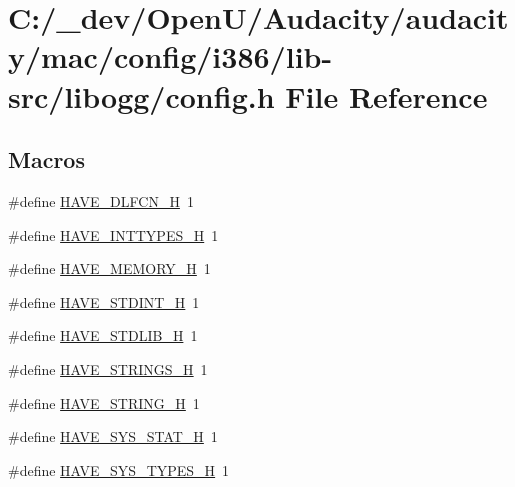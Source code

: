 \hypertarget{mac_2config_2i386_2lib-src_2libogg_2config_8h}{}\section{C\+:/\+\_\+dev/\+Open\+U/\+Audacity/audacity/mac/config/i386/lib-\/src/libogg/config.h File Reference}
\label{mac_2config_2i386_2lib-src_2libogg_2config_8h}
\subsection*{Macros}
\begin{DoxyCompactItemize}
\item 
\#define \hyperlink{mac_2config_2i386_2lib-src_2libogg_2config_8h_a0ee1617ff2f6885ef384a3dd46f9b9d7}{H\+A\+V\+E\+\_\+\+D\+L\+F\+C\+N\+\_\+H}~1
\item 
\#define \hyperlink{mac_2config_2i386_2lib-src_2libogg_2config_8h_ab90a030ff2790ebdc176660a6dd2a478}{H\+A\+V\+E\+\_\+\+I\+N\+T\+T\+Y\+P\+E\+S\+\_\+H}~1
\item 
\#define \hyperlink{mac_2config_2i386_2lib-src_2libogg_2config_8h_ae93a78f9d076138897af441c9f86f285}{H\+A\+V\+E\+\_\+\+M\+E\+M\+O\+R\+Y\+\_\+H}~1
\item 
\#define \hyperlink{mac_2config_2i386_2lib-src_2libogg_2config_8h_ab6cd6d1c63c1e26ea2d4537b77148354}{H\+A\+V\+E\+\_\+\+S\+T\+D\+I\+N\+T\+\_\+H}~1
\item 
\#define \hyperlink{mac_2config_2i386_2lib-src_2libogg_2config_8h_a9e0e434ec1a6ddbd97db12b5a32905e0}{H\+A\+V\+E\+\_\+\+S\+T\+D\+L\+I\+B\+\_\+H}~1
\item 
\#define \hyperlink{mac_2config_2i386_2lib-src_2libogg_2config_8h_a405d10d46190bcb0320524c54eafc850}{H\+A\+V\+E\+\_\+\+S\+T\+R\+I\+N\+G\+S\+\_\+H}~1
\item 
\#define \hyperlink{mac_2config_2i386_2lib-src_2libogg_2config_8h_ad4c234dd1625255dc626a15886306e7d}{H\+A\+V\+E\+\_\+\+S\+T\+R\+I\+N\+G\+\_\+H}~1
\item 
\#define \hyperlink{mac_2config_2i386_2lib-src_2libogg_2config_8h_ace156430ba007d19b4348a950d0c692b}{H\+A\+V\+E\+\_\+\+S\+Y\+S\+\_\+\+S\+T\+A\+T\+\_\+H}~1
\item 
\#define \hyperlink{mac_2config_2i386_2lib-src_2libogg_2config_8h_a69dc70bea5d1f8bd2be9740e974fa666}{H\+A\+V\+E\+\_\+\+S\+Y\+S\+\_\+\+T\+Y\+P\+E\+S\+\_\+H}~1
\item 

\end{DoxyCompactItemize}
